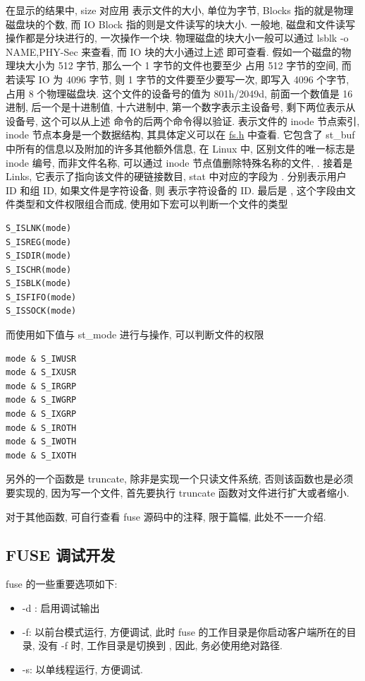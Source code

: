 在显示的结果中,  size 对应用  表示文件的大小, 单位为字节,
Blocks 指的就是物理磁盘块的个数, 而 IO Block 指的则是文件读写的块大小.
一般地, 磁盘和文件读写操作都是分块进行的, 一次操作一个块.
物理磁盘的块大小一般可以通过 lsblk -o NAME,PHY-Sec 来查看, 而 IO 块的大小通过上述
 即可查看. 假如一个磁盘的物理块大小为 512 字节, 那么一个 1 字节的文件也要至少
占用 512 字节的空间, 而若读写 IO 为 4096 字节, 则 1 字节的文件要至少要写一次, 即写入 4096
个字节, 占用 8 个物理磁盘块. 这个文件的设备号的值为 801h/2049d, 前面一个数值是 16 进制,
后一个是十进制值, 十六进制中, 第一个数字表示主设备号, 剩下两位表示从设备号, 这个可以从上述
命令的后两个命令得以验证.  表示文件的 inode 节点索引,
inode 节点本身是一个数据结构, 其具体定义可以在
\href{https://github.com/torvalds/linux/blob/master/include/linux/fs.h}{fs.h} 中查看.
它包含了 st\_buf 中所有的信息以及附加的许多其他额外信息, 在 Linux 中, 区别文件的唯一标志是
inode 编号, 而非文件名称, 可以通过 inode 节点值删除特殊名称的文件,
. 接着是 Links,
它表示了指向该文件的硬链接数目, stat 中对应的字段为 .
 分别表示用户 ID 和组 ID, 如果文件是字符设备,
则  表示字符设备的 ID. 最后是 ,
这个字段由文件类型和文件权限组合而成, 使用如下宏可以判断一个文件的类型
\begin{lstlisting}[style=verb]
S_ISLNK(mode)
S_ISREG(mode)
S_ISDIR(mode)
S_ISCHR(mode)
S_ISBLK(mode)
S_ISFIFO(mode)
S_ISSOCK(mode)
\end{lstlisting}
而使用如下值与 st\_mode 进行与操作, 可以判断文件的权限
\begin{lstlisting}[style=verb]
mode & S_IWUSR
mode & S_IXUSR
mode & S_IRGRP
mode & S_IWGRP
mode & S_IXGRP
mode & S_IROTH
mode & S_IWOTH
mode & S_IXOTH
\end{lstlisting}

另外的一个函数是 truncate, 除非是实现一个只读文件系统, 否则该函数也是必须要实现的,
因为写一个文件, 首先要执行 truncate 函数对文件进行扩大或者缩小.

对于其他函数, 可自行查看 fuse 源码中的注释, 限于篇幅, 此处不一一介绍.

\subsection{FUSE 调试开发}
fuse 的一些重要选项如下:
\begin{itemize}
    \item -d : 启用调试输出
    \item -f: 以前台模式运行, 方便调试, 此时 fuse 的工作目录是你启动客户端所在的目录,
        没有 -f 时, 工作目录是切换到 \fbox{/}, 因此, 务必使用绝对路径.
    \item -s: 以单线程运行, 方便调试.
\end{itemize}

